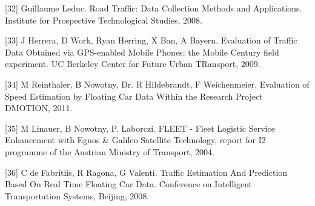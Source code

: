 \documentclass[final,fmstyle]{fpunathesis}
\begin{document}
[32] Guillaume Leduc. Road Traffic: Data Collection Methods and Applications. Institute for Prospective Technological Studies, 2008.

[33] J Herrera, D Work, Ryan Herring, X Ban, A Bayern. Evaluation of Traffic Data Obtained via GPS-enabled Mobile Phones: the Mobile Century field experiment. UC Berkeley Center for Future Urban TRansport, 2009.

[34] M Reinthaler, B Nowotny, Dr. R Hildebrandt, F Weichenmeier. Evaluation of Speed Estimation by Floating Car Data Within the Research Project DMOTION, 2011.

[35] M Linauer, B Nowotny, P. Laborczi. FLEET - Fleet Logistic Service Enhancement with Egnos \& Galileo Satellite Technology, report for I2 programme of the Austrian Ministry of Transport, 2004.

[36] C de Fabritiis, R Ragona, G Valenti. Traffic Estimation And Prediction Based On Real Time Floating Car Data. Conference on Intelligent Transportation Systems, Beijing, 2008.
\end{document}
